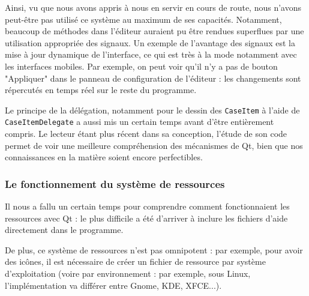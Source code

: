Ainsi, vu que nous avons appris à nous en servir en cours de route, nous n'avons peut-être pas utilisé ce système au maximum de ses
capacités. Notamment, beaucoup de méthodes dans l'éditeur auraient pu être rendues superflues par une utilisation appropriée des signaux.
Un exemple de l'avantage des signaux est la mise à jour dynamique de l'interface, ce qui est très à la mode notamment avec
les interfaces mobiles. Par exemple, on peut voir qu'il n'y a pas de bouton "Appliquer" dans le panneau de configuration de l'éditeur :
les changements sont répercutés en temps réel sur le reste du programme.

Le principe de la délégation, notamment pour le dessin des \texttt{CaseItem} à l'aide de \texttt{CaseItemDelegate} a aussi mis un certain temps avant d'être entièrement compris.
Le lecteur étant plus récent dans sa conception, l'étude de son code permet de voir une meilleure compréhension des mécanismes de Qt,
bien que nos connaissances en la matière soient encore perfectibles.

\subsubsection{Le fonctionnement du système de ressources}
Il nous a fallu un certain temps pour comprendre comment fonctionnaient les ressources avec Qt :
le plus difficile a été d'arriver à inclure les fichiers d'aide directement dans le programme.

De plus, ce système de ressources n'est pas omnipotent : par exemple, pour avoir des icônes, il est
nécessaire de créer un fichier de ressource par système d'exploitation (voire par environnement : par exemple,
sous Linux, l'implémentation va différer entre Gnome, KDE, XFCE...).
